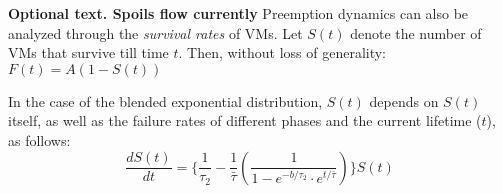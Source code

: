 

\textbf{Optional text. Spoils flow currently}
Preemption dynamics can also be analyzed through the \emph{survival rates} of VMs.
Let $S(t)$ denote the number of VMs that survive till time $t$.
Then, without loss of generality: $F(t) = A(1-S(t))$

In the case of the blended exponential distribution, $S(t)$ depends on $S(t)$ itself, as well as the failure rates of different phases and the current lifetime ($t$), as follows:
\begin{equation}
  \label{eq:ramanujan}
  \dfrac{dS(t)}{dt} = \{\dfrac{1}{\tau_2} - \dfrac{1}{\bar{\tau}}(\dfrac{1}{1-e^{-b/\tau_2} \cdot e^{t/\bar{\tau}}}) \}S(t)
\end{equation}





